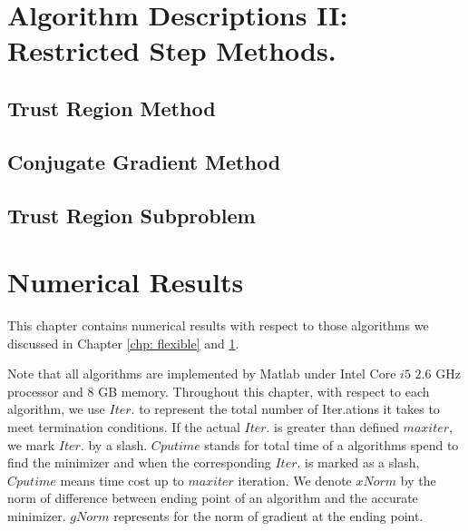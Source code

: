 \documentclass[11pt]{report}
\begin{document}
\chapter{Algorithm Descriptions II: Restricted Step Methods.}\label{chp: restricted}

\section{Trust Region Method}

\section{Conjugate Gradient Method}

\section{Trust Region Subproblem}




\chapter{Numerical Results}

This chapter contains numerical results with respect to those algorithms we discussed in Chapter \ref{chp: flexible} and \ref{chp: restricted}. 

Note that all algorithms are implemented by Matlab under Intel Core $i5$ $2.6$ GHz processor and $8$ GB memory. Throughout this chapter, with respect to each algorithm, we use $Iter.$ to represent the total number of Iter.ations it takes to meet termination conditions. If the actual $Iter.$ is greater than defined $maxiter$, we mark $Iter.$ by a slash. $Cputime$ stands for total time of a algorithms spend to find the minimizer and when the corresponding $Iter.$ is marked as a slash, $Cputime$ means time cost up to $maxiter$ iteration. We denote $xNorm$ by the norm of difference between ending point of an algorithm and the accurate minimizer. $gNorm$ represents for the norm of gradient at the ending point.
\end{document}
